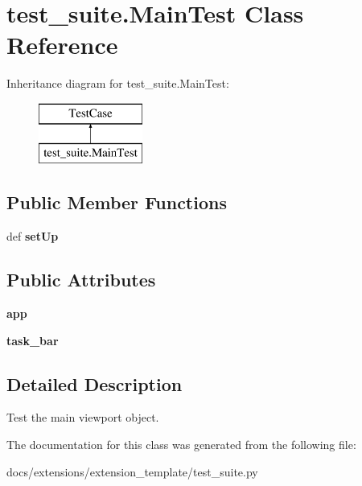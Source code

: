 \hypertarget{classtest__suite_1_1MainTest}{\section{test\+\_\+suite.\+Main\+Test Class Reference}
\label{classtest__suite_1_1MainTest}
}
Inheritance diagram for test\+\_\+suite.\+Main\+Test\+:\begin{figure}[H]
\begin{center}
\leavevmode
\includegraphics[height=2.000000cm]{classtest__suite_1_1MainTest}
\end{center}
\end{figure}
\subsection*{Public Member Functions}
\begin{DoxyCompactItemize}
\item 
\hypertarget{classtest__suite_1_1MainTest_a57bb1945a0545f0fa500dcc90c169582}{def {\bfseries set\+Up}}\label{classtest__suite_1_1MainTest_a57bb1945a0545f0fa500dcc90c169582}

\end{DoxyCompactItemize}
\subsection*{Public Attributes}
\begin{DoxyCompactItemize}
\item 
\hypertarget{classtest__suite_1_1MainTest_a2b8604f658425b346560313e53b5043e}{{\bfseries app}}\label{classtest__suite_1_1MainTest_a2b8604f658425b346560313e53b5043e}

\item 
\hypertarget{classtest__suite_1_1MainTest_a5507ff6888c48491ca3b1c97fb7bd505}{{\bfseries task\+\_\+bar}}\label{classtest__suite_1_1MainTest_a5507ff6888c48491ca3b1c97fb7bd505}

\end{DoxyCompactItemize}


\subsection{Detailed Description}
\begin{DoxyVerb}Test the main viewport object.
\end{DoxyVerb}
 

The documentation for this class was generated from the following file\+:\begin{DoxyCompactItemize}
\item 
docs/extensions/extension\+\_\+template/test\+\_\+suite.\+py\end{DoxyCompactItemize}
